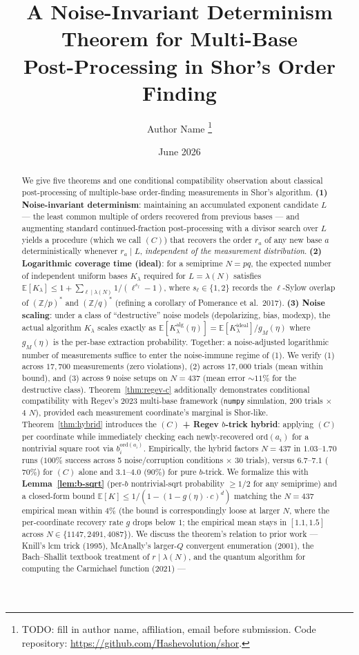 \documentclass[11pt]{article}
\title{A Noise-Invariant Determinism Theorem for Multi-Base \\
Post-Processing in Shor's Order Finding}
\author{%
  Author Name%
  \thanks{TODO: fill in author name, affiliation, email before submission. Code repository: \url{https://github.com/Hashevolution/shor}.}%
}
\date{June 2026}
\begin{document}
\maketitle

\begin{abstract}
We give five theorems and one conditional compatibility observation about classical post-processing of multiple-base order-finding measurements in Shor's algorithm. \textbf{(1) Noise-invariant determinism}: maintaining an accumulated exponent candidate $L$ --- the least common multiple of orders recovered from previous bases --- and augmenting standard continued-fraction post-processing with a divisor search over $L$ yields a procedure (which we call $(C)$) that recovers the order $r_a$ of any new base $a$ deterministically whenever $r_a \mid L$, \emph{independent of the measurement distribution}. \textbf{(2) Logarithmic coverage time (ideal)}: for a semiprime $N = pq$, the expected number of independent uniform bases $K_\lambda$ required for $L = \lambda(N)$ satisfies $\mathbb{E}[K_\lambda] \leq 1 + \sum_{\ell \mid \lambda(N)} 1/(\ell^{s_\ell} - 1)$, where $s_\ell \in \{1, 2\}$ records the $\ell$-Sylow overlap of $(\mathbb{Z}/p)^*$ and $(\mathbb{Z}/q)^*$ (refining a corollary of Pomerance et al.~2017). \textbf{(3) Noise scaling}: under a class of ``destructive'' noise models (depolarizing, bias, modexp), the actual algorithm $K_\lambda$ scales exactly as $\mathbb{E}[K_\lambda^{\text{alg}}(\eta)] = \mathbb{E}[K_\lambda^{\text{ideal}}] / g_M(\eta)$ where $g_M(\eta)$ is the per-base extraction probability. Together: a noise-adjusted logarithmic number of measurements suffice to enter the noise-immune regime of (1). We verify (1) across $17{,}700$ measurements (zero violations), (2) across $17{,}000$ trials (mean within bound), and (3) across 9 noise setups on $N = 437$ (mean error $\sim 11\%$ for the destructive class). Theorem~\ref{thm:regev-c} additionally demonstrates conditional compatibility with Regev's 2023 multi-base framework (\texttt{numpy} simulation, 200 trials $\times$ 4 $N$), provided each measurement coordinate's marginal is Shor-like. Theorem~\ref{thm:hybrid} introduces the \textbf{$(C)$ + Regev $b$-trick hybrid}: applying $(C)$ per coordinate while immediately checking each newly-recovered $\mathrm{ord}(a_i)$ for a nontrivial square root via $b_i^{\mathrm{ord}(a_i)}$. Empirically, the hybrid factors $N = 437$ in $1.03$--$1.70$ runs ($100\%$ success across 5 noise/corruption conditions $\times$ 30 trials), versus $6.7$--$7.1$ ($70\%$) for $(C)$ alone and $3.1$--$4.0$ ($90\%$) for pure $b$-trick. We formalize this with \textbf{Lemma~\ref{lem:b-sqrt}} (per-$b$ nontrivial-sqrt probability $\geq 1/2$ for any semiprime) and a closed-form bound $\mathbb{E}[K] \leq 1/(1 - (1 - g(\eta) \cdot c)^d)$ matching the $N = 437$ empirical mean within $4\%$ (the bound is correspondingly loose at larger $N$, where the per-coordinate recovery rate $g$ drops below $1$; the empirical mean stays in $[1.1, 1.5]$ across $N \in \{1147, 2491, 4087\}$). We discuss the theorem's relation to prior work --- Knill's lcm trick (1995), McAnally's larger-$Q$ convergent enumeration (2001), the Bach--Shallit textbook treatment of $r \mid \lambda(N)$, and the quantum algorithm for computing the Carmichael function (2021) --- 
\end{abstract}
\end{document}
